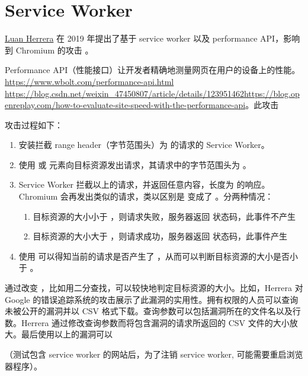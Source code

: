 \section{Service Worker}

\href{https://blog.lbherrera.me/}{Luan Herrera} 在 2019 年提出了基于 service worker 以及 performance API，影响到 Chromium 的攻击 \cite{herrera}。

Performance API（性能接口）让开发者精确地测量网页在用户的设备上的性能。\url{https://www.wbolt.com/performance-api.html}
\url{https://blog.csdn.net/weixin_47450807/article/details/123951462}\url{https://blog.openreplay.com/how-to-evaluate-site-speed-with-the-performance-api}。此攻击

攻击过程如下：

\begin{enumerate}
    \item 安装拦截 range header（字节范围头）为  的请求的 Service Worker。
    \item 使用  或  元素向目标资源发出请求，其请求中的字节范围头为 。
    \item Service Worker 拦截以上的请求，并返回任意内容，长度为  的响应。Chromium 会再发出类似的请求，类以区别是  变成了 。分两种情况：
    \begin{enumerate}
        \item 目标资源的大小小于 ，则请求失败，服务器返回  状态码，此事件不产生 
        \item 目标资源的大小大于 ，则请求成功，服务器返回  状态码，此事件产生 
    \end{enumerate}
    \item 使用  可以得知当前的请求是否产生了 ，从而可以判断目标资源的大小是否小于 。
\end{enumerate}

通过改变 ，比如用二分查找，可以较快地判定目标资源的大小。比如，Herrera 对 Google 的错误追踪系统的攻击展示了此漏洞的实用性。拥有权限的人员可以查询未被公开的漏洞并以 CSV 格式下载。查询参数可以包括漏洞所在的文件名以及行数。Herrera 通过修改查询参数而将包含漏洞的请求所返回的 CSV 文件的大小放大。最后使用以上的漏洞可以

（测试包含 service worker 的网站后，为了注销 service worker, 可能需要重启浏览器程序）。

